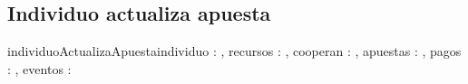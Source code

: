 \documentclass[10pt,a4paper]{article}
\begin{document}
\subsection{Individuo actualiza apuesta}
\begin{proc}{individuoActualizaApuesta}{\In individuo : \nat, \In recursos : \TLista{\float}, \In cooperan : \TLista{\bool}, \Inout apuestas : ,  \In pagos : ,  \In eventos : \TLista{\TLista{\nat}}}{}
\requiere{}
\asegura{}
    
\end{proc}
\end{document}
